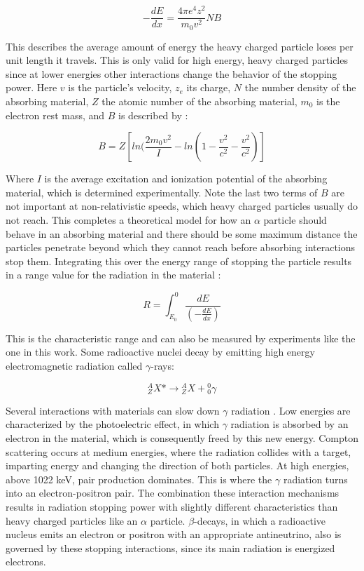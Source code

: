 \begin{equation}
-\frac{dE}{dx} = \frac{4\pi e^{4} z^{2}}{m_{0}v^{2}} NB
\end{equation}

This describes the average amount of energy the heavy charged particle loses per unit length it travels. This is only valid for high energy, heavy charged particles since at lower energies other interactions change the behavior of the stopping power. Here $v$ is the particle’s velocity, $z_e$ its charge, $N$ the number density of the absorbing material, $Z$ the atomic number of the absorbing material, $m_0$ is the electron rest mass, and $B$ is described by \cite{knoll}:

\begin{equation}
B = Z [ ln(\frac{2m_{0}v^{2}}{I} - ln(1 - \frac{v^2}{c^2} - \frac{v^2}{c^2}) ]
\end{equation}

Where $I$ is the average excitation and ionization potential of the absorbing material, which is determined experimentally. Note the last two terms of $B$ are not important at non-relativistic speeds, which heavy charged particles usually do not reach. This completes a theoretical model for how an $\alpha$ particle should behave in an absorbing material and there should be some maximum distance the particles penetrate beyond which they cannot reach before absorbing interactions stop them. Integrating this over the energy range of stopping the particle results in a range value for the radiation in the material \cite{knoll}:

\begin{equation}
R = \int_{E_{0}}^{0} \frac{dE}{(-\frac{dE}{dx})}
\end{equation}

This is the characteristic range and can also be measured by experiments like the one in this work. Some radioactive nuclei decay by emitting high energy electromagnetic radiation called $\gamma$-rays:

\begin{equation}
{}^{A}_{Z}X* \rightarrow {}^{A}_{Z}X + {}^{0}_{0}\gamma
\end{equation}

Several interactions with materials can slow down $\gamma$ radiation \cite{krane}. Low energies are characterized by the photoelectric effect, in which $\gamma$ radiation is absorbed by an electron in the material, which is consequently freed by this new energy. Compton scattering occurs at medium energies, where the radiation collides with a target, imparting energy and changing the direction of both particles. At high energies, above 1022 keV, pair production dominates. This is where the $\gamma$ radiation turns into an electron-positron pair. The combination these interaction mechanisms results in radiation stopping power with slightly different characteristics than heavy charged particles like an $\alpha$ particle. $\beta$-decays, in which a radioactive nucleus emits an electron or positron with an appropriate antineutrino, also is governed by these stopping interactions, since its main radiation is energized electrons.

